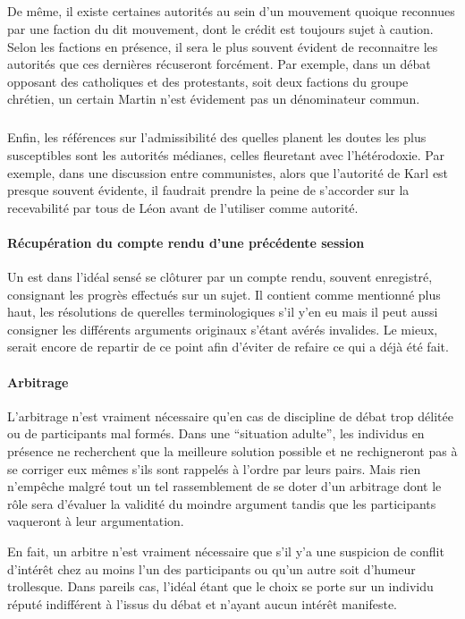 \subparagraph{}
De même, il existe certaines autorités au sein d’un mouvement quoique reconnues par une faction du dit mouvement, dont le crédit est toujours sujet à caution. Selon les factions en présence, il sera le plus souvent évident de reconnaitre les autorités que ces dernières récuseront forcément. Par exemple, dans un débat opposant des catholiques et des protestants, soit deux factions du groupe chrétien, un certain Martin  n’est évidement pas un dénominateur commun.

\subparagraph{}
Enfin, les références sur l’admissibilité des quelles planent les doutes les plus susceptibles sont les autorités médianes, celles fleuretant avec l’hétérodoxie. Par exemple, dans une discussion entre communistes, alors que l’autorité de Karl  est presque souvent évidente, il faudrait prendre la peine de s’accorder sur la recevabilité par tous de Léon  avant de l’utiliser comme autorité.

\paragraph{Récupération du compte rendu d’une précédente session} Un \mainabbr{} est dans l’idéal sensé se clôturer par un compte rendu, souvent enregistré, consignant les progrès effectués sur un sujet. Il contient comme mentionné plus haut, les résolutions de querelles terminologiques s’il y’en eu mais il peut aussi consigner les différents arguments originaux s’étant avérés invalides. Le mieux, serait encore de repartir de ce point afin d’éviter de refaire ce qui a déjà été fait.

\paragraph{Arbitrage} L’arbitrage n’est vraiment nécessaire qu’en cas de discipline de débat trop délitée ou de participants mal formés. Dans une \enquote{situation adulte}, les individus en présence ne recherchent que la meilleure solution possible et ne rechigneront pas à se corriger eux mêmes s’ils sont rappelés à l’ordre par leurs pairs. Mais rien n’empêche malgré tout un tel rassemblement de se doter d’un arbitrage dont le rôle sera d’évaluer la validité du moindre argument tandis que les participants vaqueront à leur argumentation.

En fait, un arbitre n’est vraiment nécessaire que s’il y’a une suspicion de conflit d’intérêt chez au moins l’un des participants ou qu’un autre soit d’humeur trollesque. Dans pareils cas, l’idéal étant que le choix se porte sur un individu réputé indifférent à l’issus du débat et n’ayant aucun intérêt manifeste.

